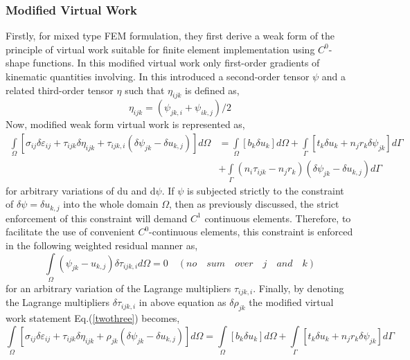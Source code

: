 \documentclass[12pt]{article}
\begin{document}
\subsubsection{ Modified Virtual Work}
Firstly, for mixed type FEM formulation, they first derive a weak form of the principle of virtual
work suitable for finite element implementation using $C^0$-shape functions. In this modified virtual work only first-order gradients of kinematic quantities involving. In this introduced a second-order tensor $\psi$ and a related third-order tensor $\eta$ such that $\eta_{ijk}$ is defined as,
\\
\begin{equation}\label{twotwo} 
\eta_{ijk} = (\psi_{jk,i}+\psi_{ik,j})/2
\end{equation}
Now, modified weak form virtual work is represented as,
\begin{equation}\label{twothree}
\begin{aligned}
\int\limits_\Omega\! [ \sigma_{ij}\delta\varepsilon_{ij} + \tau_{ijk}\delta\eta_{ijk} + \tau_{ijk,i}(\delta\psi_{jk}-\delta u_{k,j})  ] d\Omega &= \int\limits_\Omega\! [b_k\delta u_k] d\Omega + \int\limits_\Gamma\! [ t_k\delta u_k + n_jr_k\delta\psi_{jk} ] d\Gamma \\
&+ \int\limits_\Gamma\! ( n_i\tau_{ijk} -n_jr_k ) ( \delta\psi_{jk}-\delta u_{k,j} ) d\Gamma
\end{aligned}
\end{equation}
\newline
for arbitrary variations of du and d$\psi$. If $ \psi $ is subjected strictly to the constraint of
$ \delta\psi = \delta u_{k,j} $ into the whole domain $ \Omega $, then as previously discussed, the strict enforcement of this constraint will demand $C^1$ continuous elements. Therefore, to facilitate the use of convenient $C^0$-continuous elements, this constraint is enforced in the following weighted residual manner as,
\begin{equation}\label{twofour}
\int\limits_\Omega\! (\psi_{jk} - u_{k,j})\delta\tau_{ijk,i} d\Omega = 0  \quad (no \quad sum\quad over \quad j \quad and \quad k)
\end{equation}
for an arbitrary variation of the Lagrange multipliers $ \tau_{ijk,i} $. Finally, by denoting the Lagrange multipliers $ \delta \tau_{ijk,i}$ in above equation as $ \delta\rho_{jk} $ the modified virtual work statement Eq.(\ref{twothree}) becomes,
\begin{equation}\label{twofive}
\int\limits_\Omega\! [ \sigma_{ij}\delta\varepsilon_{ij} + \tau_{ijk}\delta\eta_{ijk} + \rho_{jk}(\delta\psi_{jk}-\delta u_{k,j})] d\Omega = \int\limits_\Omega\! [b_k\delta u_k] d\Omega + \int\limits_\Gamma\! [ t_k\delta u_k + n_jr_k\delta\psi_{jk} ] d\Gamma
\end{equation}
\end{document}
